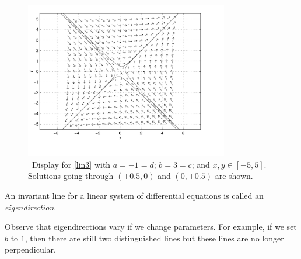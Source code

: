 \documentclass{ximera}
\begin{document}
\begin{figure}[htb]
     \centerline{%
     \includegraphics[width=3.5in]{../figures/invline.pdf}}
     \caption{{\sf \PPLANE\ Display} for \protect\eqref{lin3} with
             $a=-1=d$; $b=3=c$; and $x,y\in [-5,5]$.
	Solutions going through $(\pm 0.5,0)$ and $(0,\pm 0.5)$ are shown.}
     \label{F:invariantlines}
\end{figure}

\begin{definition} \label{D:eigendirection}
An invariant line for a linear system of differential equations
is called an {\em eigendirection}.
\end{definition}

Observe that eigendirections vary if we change parameters.  For
example, if we set $b$ to $1$, then there are still two
distinguished lines but these lines are no longer perpendicular.
\end{document}
